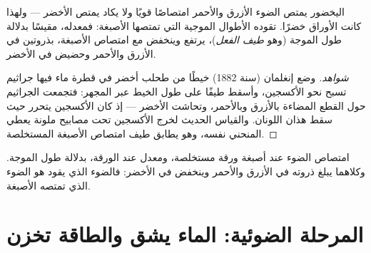 \begin{proposition}\label{prop:g12:photosynthesis:spectrum}
اليخضور يمتص الضوء الأزرق والأحمر امتصاصًا قويًا ولا يكاد يمتص الأخضر
--- ولهذا كانت الأوراق خضرًا.  تقوده الأطوال الموجية
التي تمتصها الأصبغة: فمعدله، مقيسًا بدلالة طول الموجة (وهو \emph{طيف
الفعل})، يرتفع وينخفض مع امتصاص الأصبغة، بذروتين في الأزرق والأحمر
وحضيض في الأخضر.
\end{proposition}
\begin{proof}[شواهد]
وضع إنغلمان (سنة 1882) خيطًا من طحلب أخضر في قطرة ماء فيها جراثيم
تسبح نحو الأكسجين، وأسقط طيفًا على طول الخيط عبر المجهر: فتجمعت
الجراثيم حول القطع المضاءة بالأزرق وبالأحمر، وتحاشت الأخضر --- إذ كان
الأكسجين يتحرر حيث سقط هذان اللونان. والقياس الحديث لخرج الأكسجين تحت
مصابيح ملونة يعطي المنحني نفسه، وهو يطابق طيف امتصاص الأصبغة
المستخلصة.
\end{proof}

\begin{omfigure}

{\small امتصاص الضوء عند أصبغة ورقة مستخلصة، ومعدل  عند
الورقة، بدلالة طول الموجة. وكلاهما يبلغ ذروته في الأزرق والأحمر وينخفض
في الأخضر: فالضوء الذي يقود  هو الضوء الذي تمتصه
الأصبغة.}
\end{omfigure}

\section{المرحلة الضوئية: الماء يشق والطاقة تخزن}

